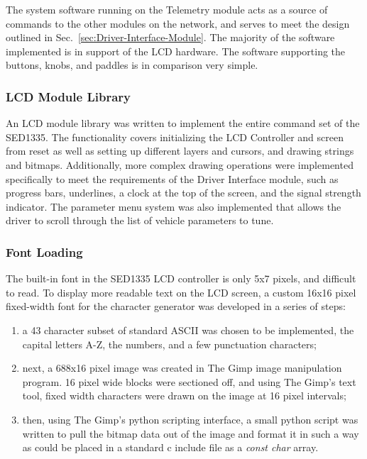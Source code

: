 The system software running on the Telemetry module acts as a source of commands to the other modules on the network, and serves to meet the design outlined in Sec.\ \ref{sec:Driver-Interface-Module}. The majority of the software implemented is in support of the LCD hardware. The software supporting the buttons, knobs, and paddles is in comparison very simple.

\subsubsection{LCD Module Library}

An LCD module library was written to implement the entire command set of the SED1335. The functionality covers initializing the LCD Controller and screen from reset as well as setting up different layers and cursors, and drawing strings and bitmaps. Additionally, more complex drawing operations were implemented specifically to meet the requirements of the Driver Interface module, such as progress bars, underlines, a clock at the top of the screen, and the signal strength indicator. The parameter menu system was also implemented that allows the driver to scroll through the list of vehicle parameters to tune.

\subsubsection{Font Loading\label{sec:lcd_module_font_loading}}

The built-in font in the SED1335 LCD controller is only 5x7 pixels, and difficult to read. To display more readable text on the LCD screen, a custom 16x16 pixel fixed-width font for the character generator was developed in a series of steps:
\begin{enumerate}
 \item a 43 character subset of standard ASCII was chosen to be implemented, the capital letters A-Z, the numbers, and a few punctuation characters;
 \item next, a 688x16 pixel image was created in The Gimp image manipulation program. 16 pixel wide blocks were sectioned off, and using The Gimp's text tool, fixed width characters were drawn on the image at 16 pixel intervals;
  \item then, using The Gimp's python scripting interface, a small python script was written to pull the bitmap data out of the image and format it in such a way as could be placed in a standard c include file as a \emph{const char} array.
\end{enumerate}


